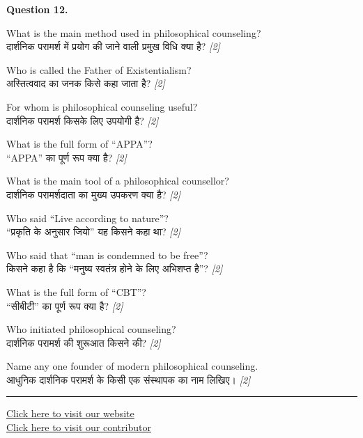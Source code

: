 \documentclass[11pt,a4paper]{article}
\newcommand{\pts}[1]{\hfill \textit{[#1]}}
\begin{document}
\noindent \textbf{Question 12.}
\begin{parts}
  \item What is the main method used in philosophical counseling?\\[1pt]
        दार्शनिक परामर्श में प्रयोग की जाने वाली प्रमुख विधि क्या है? \pts{2}

  \item Who is called the Father of Existentialism?\\[1pt]
        अस्तित्ववाद का जनक किसे कहा जाता है? \pts{2}

  \item For whom is philosophical counseling useful?\\[1pt]
        दार्शनिक परामर्श किसके लिए उपयोगी है? \pts{2}

  \item What is the full form of ``APPA''?\\[1pt]
        ``APPA'' का पूर्ण रूप क्या है? \pts{2}

  \item What is the main tool of a philosophical counsellor?\\[1pt]
        दार्शनिक परामर्शदाता का मुख्य उपकरण क्या है? \pts{2}

  \item Who said ``Live according to nature''?\\[1pt]
        ``प्रकृति के अनुसार जियो'' यह किसने कहा था? \pts{2}

  \item Who said that ``man is condemned to be free''?\\[1pt]
        किसने कहा है कि ``मनुष्य स्वतंत्र होने के लिए अभिशप्त है''? \pts{2}

  \item What is the full form of ``CBT''?\\[1pt]
        ``सीबीटी'' का पूर्ण रूप क्या है? \pts{2}

  \item Who initiated philosophical counseling?\\[1pt]
        दार्शनिक परामर्श की शुरूआत किसने की? \pts{2}

  \item Name any one founder of modern philosophical counseling.\\[1pt]
        आधुनिक दार्शनिक परामर्श के किसी एक संस्थापक का नाम लिखिए। \pts{2}
\end{parts}

\vfill
\rule{\linewidth}{0.4pt}

\begin{center}\small
\href{https://bhu-exam.vercel.app/}{Click here to visit our website}\\[4pt]
\href{https://me-aryan.vercel.app/}{Click here to visit our contributor}
\end{center}
\end{document}
